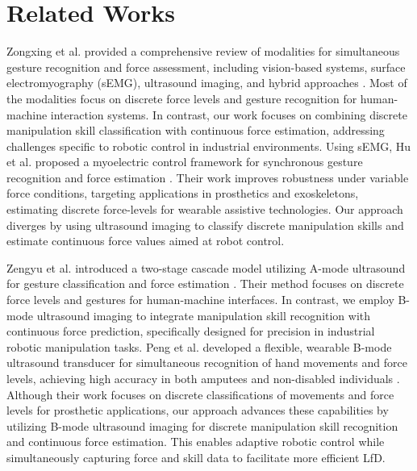 \section{Related Works}
Zongxing et al. provided a comprehensive review of modalities for simultaneous gesture recognition and force assessment, including vision-based systems, surface electromyography (sEMG), ultrasound imaging, and hybrid approaches \cite{zongxing2023human}. Most of the modalities focus on discrete force levels and gesture recognition for human-machine interaction systems. In contrast, our work focuses on combining discrete manipulation skill classification with continuous force estimation, addressing challenges specific to robotic control in industrial environments. Using sEMG, Hu et al. proposed a myoelectric control framework for synchronous gesture recognition and force estimation \cite{hu2022novel}. Their work improves robustness under variable force conditions, targeting applications in prosthetics and exoskeletons, estimating discrete force-levels for wearable assistive technologies. Our approach diverges by using ultrasound imaging to classify discrete manipulation skills and estimate continuous force values aimed at robot control. 

Zengyu et al. introduced a two-stage cascade model utilizing A-mode ultrasound for gesture classification and force estimation \cite{zengyu2022simultaneous}. Their method focuses on discrete force levels and gestures for human-machine interfaces. In contrast, we employ B-mode ultrasound imaging to integrate manipulation skill recognition with continuous force prediction, specifically designed for precision in industrial robotic manipulation tasks. Peng et al. developed a flexible, wearable B-mode ultrasound transducer for simultaneous recognition of hand movements and force levels, achieving high accuracy in both amputees and non-disabled individuals \cite{peng2023novel}. Although their work focuses on discrete classifications of movements and force levels for prosthetic applications, our approach advances these capabilities by utilizing B-mode ultrasound imaging for discrete manipulation skill recognition and continuous force estimation. This enables adaptive robotic control while simultaneously capturing force and skill data to facilitate more efficient LfD.